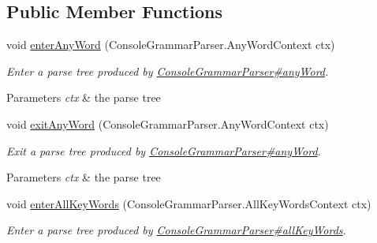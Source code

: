 \subsection*{Public Member Functions}
\begin{DoxyCompactItemize}
\item 
void \hyperlink{classgov_1_1nasa_1_1jpf_1_1inspector_1_1client_1_1parser_1_1_console_grammar_base_listener_a44861d34f48849f59146cedca5857cbe}{enter\+Any\+Word} (Console\+Grammar\+Parser.\+Any\+Word\+Context ctx)
\begin{DoxyCompactList}\small\item\em Enter a parse tree produced by \hyperlink{classgov_1_1nasa_1_1jpf_1_1inspector_1_1client_1_1parser_1_1_console_grammar_parser_a33a50c0e5499145e26945de763b14c70}{Console\+Grammar\+Parser\#any\+Word}.


\begin{DoxyParams}{Parameters}
{\em ctx} & the parse tree\\
\hline
\end{DoxyParams}
 \end{DoxyCompactList}\item 
void \hyperlink{classgov_1_1nasa_1_1jpf_1_1inspector_1_1client_1_1parser_1_1_console_grammar_base_listener_a1ad6132eb3abd0d903f4bdae7bf52e41}{exit\+Any\+Word} (Console\+Grammar\+Parser.\+Any\+Word\+Context ctx)
\begin{DoxyCompactList}\small\item\em Exit a parse tree produced by \hyperlink{classgov_1_1nasa_1_1jpf_1_1inspector_1_1client_1_1parser_1_1_console_grammar_parser_a33a50c0e5499145e26945de763b14c70}{Console\+Grammar\+Parser\#any\+Word}.


\begin{DoxyParams}{Parameters}
{\em ctx} & the parse tree\\
\hline
\end{DoxyParams}
 \end{DoxyCompactList}\item 
void \hyperlink{classgov_1_1nasa_1_1jpf_1_1inspector_1_1client_1_1parser_1_1_console_grammar_base_listener_afc8db38b9720cb6dc28d28d8fe2ee739}{enter\+All\+Key\+Words} (Console\+Grammar\+Parser.\+All\+Key\+Words\+Context ctx)
\begin{DoxyCompactList}\small\item\em Enter a parse tree produced by \hyperlink{classgov_1_1nasa_1_1jpf_1_1inspector_1_1client_1_1parser_1_1_console_grammar_parser_ae08871adf83e51273a2c368571fabd6a}{Console\+Grammar\+Parser\#all\+Key\+Words}.



\end{DoxyCompactList}
\end{DoxyCompactItemize}
